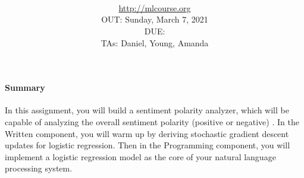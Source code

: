 \documentclass[11pt,addpoints,answers]{exam}
\title{\textsc{\hwName}
} %
\author{\courseName\\
\url{http://mlcourse.org} \\
OUT: Sunday, March 7, 2021 \\
DUE: \dueDate{} \\ 
TAs: Daniel, Young, Amanda
}
\date{}
\date{}
\begin{document}
\maketitle

\begin{notebox}
\paragraph{Summary} In this assignment, you will build a sentiment polarity analyzer, which will be capable of analyzing the overall sentiment polarity (positive or negative) . In the Written component, you will warm up by deriving stochastic gradient descent updates for logistic regression. Then in the Programming component, you will implement a logistic regression model as the core of your natural language processing system.
\end{notebox}
\end{document}
